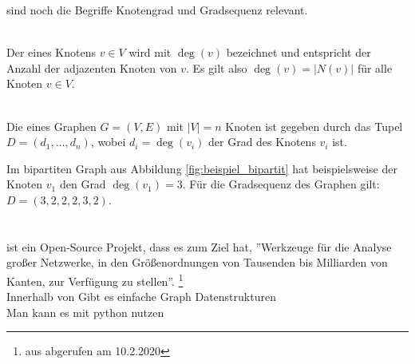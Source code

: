  sind noch die Begriffe Knotengrad und Gradsequenz relevant.
\begin{definition}[Knotengrad]~\\
Der  eines Knotens $v \in V$ wird mit $\deg(v)$ bezeichnet und entspricht der Anzahl
der adjazenten Knoten von $v$. Es gilt also $\deg(v) = |N(v)|$ für alle Knoten $v\in V$.
\end{definition}
\begin{definition}[Gradsequenz]~\\
Die  eines Graphen $G = (V,E)$ mit $|V| = n$ Knoten ist gegeben durch das Tupel
$D = (d_{1}, \dots, d_{n})$, wobei $d_{i} = \deg(v_{i})$ der Grad des Knotens $v_{i}$ ist.
\end{definition}
\noindent
Im bipartiten Graph aus Abbildung \ref{fig:beispiel_bipartit} hat beispielsweise
der Knoten $v_{1}$ den Grad $\deg(v_{1}) = 3$. Für die Gradsequenz des Graphen gilt: 
$D = (3,2,2,2,3,2)$.




\section{\nk}

\nk \cite{nk} ist ein Open-Source Projekt, dass es zum Ziel hat, ''Werkzeuge für die
Analyse großer Netzwerke, in den Größenordnungen von Tausenden bis Milliarden 
von Kanten, zur Verfügung zu stellen''.
\footnote{aus \cite{nk} abgerufen am 10.2.2020}
\\
Innerhalb von \nk Gibt es einfache Graph Datenstrukturen 
\\
Man kann es mit python nutzen 






